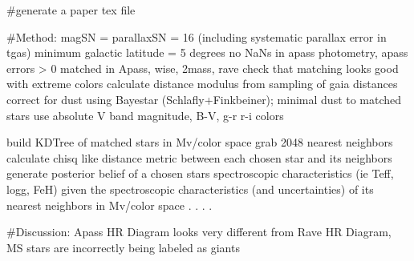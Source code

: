 #generate a paper tex file

#Method:
magSN = parallaxSN = 16 (including systematic parallax error in tgas)
minimum galactic latitude = 5 degrees
no NaNs in apass photometry, apass errors > 0
matched in Apass, wise, 2mass, rave
check that matching looks good with extreme colors
calculate distance modulus from sampling of gaia distances
correct for dust using Bayestar (Schlafly+Finkbeiner); minimal dust to matched stars
use absolute V band magnitude, B-V, g-r r-i colors

build KDTree of matched stars in Mv/color space
grab 2048 nearest neighbors
calculate chisq like distance metric between each chosen star and its neighbors
generate posterior belief of a chosen stars spectroscopic characteristics (ie Teff, logg, FeH)
  given the spectroscopic characteristics (and uncertainties) of its nearest neighbors in Mv/color space
.
.
.
.

#Discussion:
Apass HR Diagram looks very different from Rave HR Diagram, MS stars are incorrectly being labeled as giants
